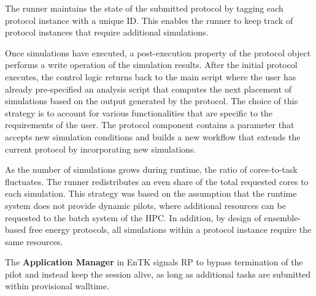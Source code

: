 The runner maintains the state of the submitted protocol by tagging each 
protocol instance with a unique ID. This enables the runner to keep track of
protocol instances that require additional simulations. 

Once simulations have executed, a post-execution property of the protocol object
performs a write operation of the simulation results. After the initial protocol 
executes, the control logic returns back to the main script where the user has 
already pre-specified an analysis script that computes the next placement of 
simulations based on the output generated by the protocol. The choice of this 
strategy is to account for various functionalities that are specific to the 
requirements of the user. The protocol component contains a parameter that 
accepts new simulation conditions and builds a new workflow that extends the 
current protocol by incorporating new simulations.

As the number of simulations grows during runtime, the ratio of cores-to-task 
fluctuates. The runner redistributes an even share of the total requested cores 
to each simulation. This strategy was based on the assumption that the runtime 
system does not provide dynamic pilots, where additional resources can be 
requested to the batch system of the HPC. In addition, by design of 
ensemble-based free energy protocols, all simulations within a protocol instance
require the same resources. 

The \textbf{Application Manager} in EnTK signals RP to 
bypass termination of the pilot and instead keep the session alive, as long as 
additional tasks are submitted within provisional walltime. 









